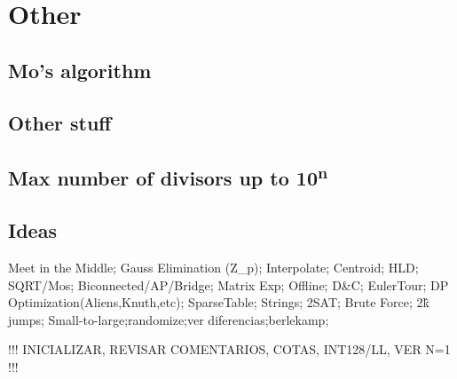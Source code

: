 \section{Other}

\subsection{Mo's algorithm}

\subsection{Other stuff}

\subsection{Max number of divisors up to 10\textsuperscript{n}}

\subsection{Ideas}
Meet in the Middle; Gauss Elimination (Z\_p); Interpolate; Centroid; HLD;
SQRT/Mos; Biconnected/AP/Bridge; Matrix Exp; Offline; D\&C; EulerTour;
DP Optimization(Aliens,Knuth,etc); SparseTable; Strings; 2SAT;
Brute Force; 2\^k jumps;
Small-to-large;randomize;ver diferencias;berlekamp;

!!! INICIALIZAR, REVISAR COMENTARIOS, COTAS, INT128/LL, VER N=1 !!!




